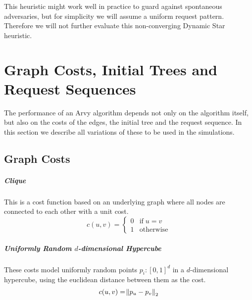 \documentclass[a4paper, oneside]{discothesis}
\begin{document}
This heuristic might work well in practice to guard against spontaneous adversaries, but for simplicity we will assume a uniform request pattern. Therefore we will not further evaluate this non-converging Dynamic Star heuristic.

\chapter{Graph Costs, Initial Trees and Request Sequences}

The performance of an Arvy algorithm depends not only on the algorithm itself, but also on the costs of the edges, the initial tree and the request sequence. In this section we describe all variations of these to be used in the simulations.

\section{Graph Costs}
\label{graph-costs}

\paragraph{Clique}\label{costs:clique} This is a cost function based on an underlying graph where all nodes are connected to each other with a unit cost.
\begin{equation}
c(u,v)=
\begin{cases}
0 & \text{if}\;u=v \\
1 & \text{otherwise}
\end{cases}
\end{equation}


\paragraph{Uniformly Random $d$-dimensional Hypercube}\label{costs:cube} These costs model uniformly random points $p_i:[0,1]^d$ in a $d$-dimensional hypercube, using the euclidean distance between them as the cost.
\begin{equation}
c(u,v)=\norm{p_u-p_v}_2
\end{equation}
\end{document}

